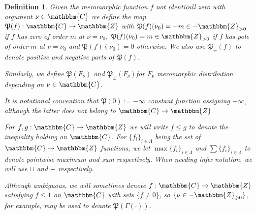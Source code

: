 \documentclass{article}
\newcommand{\assign}{:=}
\newtheorem{definition}{Definition}
\numberwithin{definition}{section}
\numberwithin{lemma}{section}
\numberwithin{proposition}{section}
{\theorembodyfont{\rmfamily}\newtheorem{remark}{Remark}
\numberwithin{remark}{section}
}
\begin{document}
\begin{definition}
  \label{def-P}Given the meromorphic function $f$ not identicall zero with
  argument $\nu \in \mathbbm{C}$ we define the map $\mathfrak{P} ( f) :
  \mathbbm{C} \rightarrow \mathbbm{Z}$ with $\mathfrak{P} ( f) ( \nu_0) = - m
  \in -\mathbbm{Z}_{> 0}$ if $f$ has zero of order $m$ at $\nu = \nu_0$,
  $\mathfrak{P} ( f) ( \nu_0) = m \in \mathbbm{Z}_{> 0}$ if $f$ has pole of
  order $m$ at $\nu = \nu_0$ and $\mathfrak{P} ( f) ( \nu_0) = 0$ otherwise.
  We also use $\mathfrak{P}_{\pm} ( f)$ to denote positive and negative parts
  of $\mathfrak{P} ( f)$.
  
  Similarly, we define $\mathfrak{P} ( F_{\nu})$ and $\mathfrak{P}_{\pm} (
  F_{\nu})$for $F_{\nu}$ meromorphic distribution depending on $\nu \in
  \mathbbm{C}$.
  
  It is notational convention that $\mathfrak{P} ( 0) \assign - \infty$
  constant function assigning $- \infty$, although the latter does not belong
  to $\mathbbm{C} \rightarrow \mathbbm{Z}$.
  
  For $f, g : \mathbbm{C} \rightarrow \mathbbm{Z}$ we will write $f \leqslant
  g$ to denote the inequality holding on $\mathbbm{C}$. For $\{ f_i \}_{i \in
  \Lambda}$ being the set of $\mathbbm{C} \rightarrow \mathbbm{Z}$ functions,
  we let $\max \{ f_i \}_{i \in \Lambda}$ and $\sum \{ f_i \}_{i \in \Lambda}$
  to denote pointwise maximum and sum respectively. When needing infix
  notation, we will use $\cup$ and $+$ respectively.
  
  Although ambiguous, we will sometimes denote $f : \mathbbm{C} \rightarrow
  \mathbbm{Z}$ satisfying $f \leqslant 1$ on $\mathbbm{C}$ with sets $\{ f
  \neq 0 \}$, so $\{ \nu \in -\mathbbm{Z}_{\geqslant 0} \}$, for example, may
  be used to denote $\mathfrak{P} ( \Gamma ( \cdot))$.
\end{definition}
\end{document}
